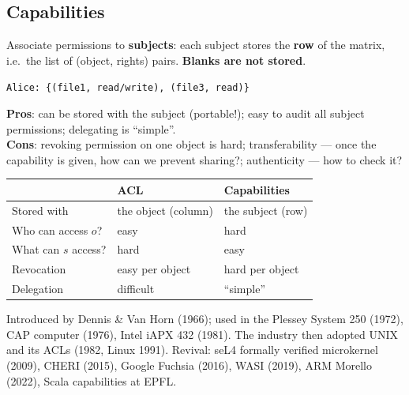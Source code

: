 \subsection{Capabilities}

\begin{defnbox}[title=Capabilities]
Associate permissions to \textbf{subjects}: each subject stores the \textbf{row} of the
matrix, i.e.\ the list of (object, rights) pairs. \textbf{Blanks are not stored}.
\begin{center}
\texttt{Alice: \{(file1, read/write), (file3, read)\}}
\end{center}
\end{defnbox}

\begin{propbox}[title=Capabilities: pros and cons]
\textbf{Pros}: can be stored with the subject (portable!); easy to audit all subject
permissions; delegating is ``simple''. \\
\textbf{Cons}: revoking permission on one object is hard; transferability --- once the
capability is given, how can we prevent sharing?; authenticity --- how to check it?
\end{propbox}

\begin{keybox}[title=ACL vs.\ capabilities]
\begin{center}
\begin{tabular}{l|l|l}
                       & \textbf{ACL}           & \textbf{Capabilities} \\ \hline
Stored with            & the object (column)    & the subject (row)     \\
Who can access $o$?    & easy                   & hard                  \\
What can $s$ access?   & hard                   & easy                  \\
Revocation             & easy per object        & hard per object       \\
Delegation             & difficult              & ``simple''
\end{tabular}
\end{center}
\end{keybox}

\begin{rembox}[title=History of capability-based security]
Introduced by Dennis \& Van Horn (1966); used in the Plessey System 250 (1972), CAP
computer (1976), Intel iAPX 432 (1981). The industry then adopted UNIX and its ACLs
(1982, Linux 1991). Revival: seL4 formally verified microkernel (2009), CHERI (2015),
Google Fuchsia (2016), WASI (2019), ARM Morello (2022), Scala capabilities at EPFL.
\end{rembox}

